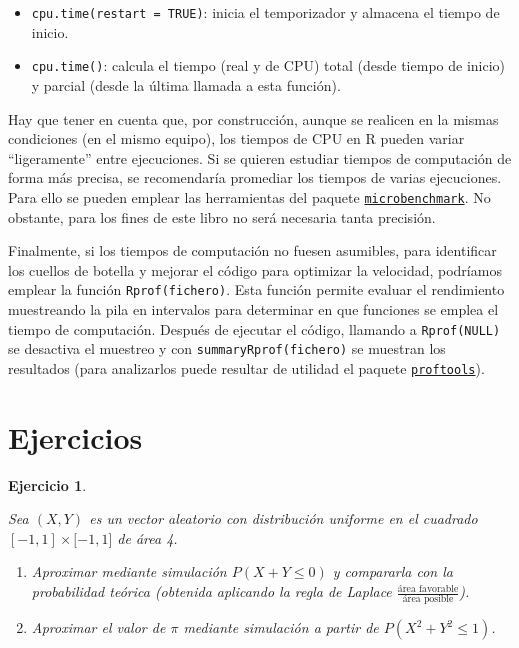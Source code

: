 \documentclass[
]{book}
\theoremstyle{break}
\newtheorem{exercise}{Ejercicio}[chapter]
\theoremstyle{nonumberplain}
\begin{document}
\begin{itemize}
  \begin{itemize}
  \item
    \texttt{cpu.time(restart\ =\ TRUE)}: inicia el temporizador y almacena el tiempo de inicio.
  \item
    \texttt{cpu.time()}: calcula el tiempo (real y de CPU) total (desde tiempo de inicio) y parcial (desde la última llamada a esta función).
  \end{itemize}
\end{itemize}

Hay que tener en cuenta que, por construcción, aunque se realicen en la mismas condiciones (en el mismo equipo), los tiempos de CPU en R pueden variar ``ligeramente'' entre ejecuciones.
Si se quieren estudiar tiempos de computación de forma más precisa, se recomendaría promediar los tiempos de varias ejecuciones.
Para ello se pueden emplear las herramientas del paquete \href{https://CRAN.R-project.org/package=microbenchmark}{\texttt{microbenchmark}}.
No obstante, para los fines de este libro no será necesaria tanta precisión.

Finalmente, si los tiempos de computación no fuesen asumibles, para identificar los cuellos de botella y mejorar el código para optimizar la velocidad, podríamos emplear la función \texttt{Rprof(fichero)}.
Esta función permite evaluar el rendimiento muestreando la pila en intervalos para determinar en que funciones se emplea el tiempo de computación.
Después de ejecutar el código, llamando a \texttt{Rprof(NULL)} se desactiva el muestreo y con \texttt{summaryRprof(fichero)} se muestran los resultados (para analizarlos puede resultar de utilidad el paquete \href{https://CRAN.R-project.org/package=proftools}{\texttt{proftools}}).

\hypertarget{ejercicios}{%
\section{Ejercicios}\label{ejercicios}}

\begin{exercise}
\protect\hypertarget{exr:simpi}{}\label{exr:simpi}

Sea \((X,Y)\) es un vector aleatorio con distribución uniforme en el
cuadrado \([-1,1]\times\lbrack-1,1]\) de área 4.

\begin{enumerate}
\def\labelenumi{\alph{enumi})}
\item
  Aproximar mediante simulación \(P\left(X + Y \leq 0 \right)\) y
  compararla con la probabilidad teórica (obtenida aplicando la
  regla de Laplace \(\frac{\text{área favorable}}{\text{área posible}}\)).
\item
  Aproximar el valor de \(\pi\) mediante simulación a partir de
  \(P\left( X^2 +Y^2 \leq 1 \right)\).
\end{enumerate}

\end{exercise}
\end{document}
